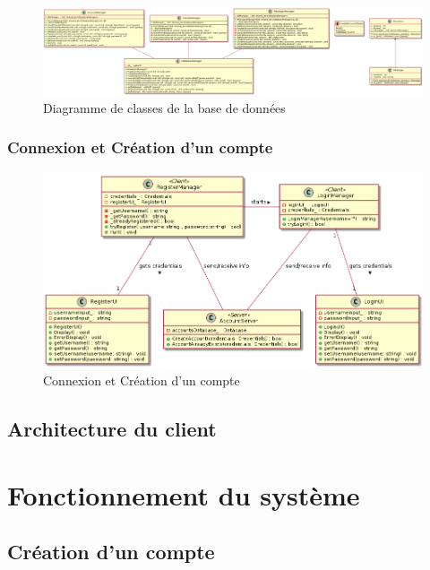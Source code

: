 \documentclass{article}
\begin{document}
\begin{figure}[!ht]
	\centering
	 \includegraphics[scale=0.2]{../res/uml/class/DatabaseClass.png}
	 \caption{Diagramme de classes de la base de données}
	 \label{fig:main-menu}
\end{figure}

\subsubsection{Connexion et Création d'un compte}

\begin{figure}[!ht]
    \centering
    \includegraphics[width=1\textwidth]{../res/uml/class/ConnexionClass.png}
    \caption{Connexion et Création d'un compte}
    \label{fig:Royal-Competition}
\end{figure}

\subsection{Architecture du client}

\section{Fonctionnement du système}

\subsection{Création d'un compte}
\end{document}
